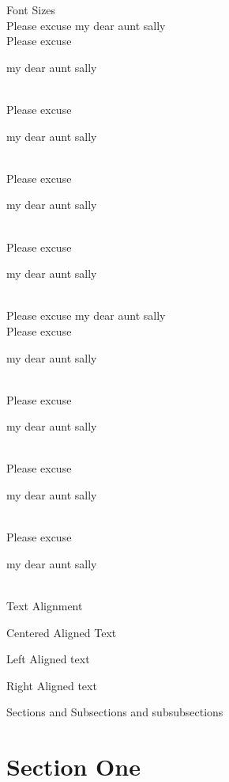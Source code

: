 \documentclass[11pt]{article}
\begin{document}
Font Sizes\\
Please excuse my dear aunt sally\\
Please excuse \begin{large}my dear aunt sally\end{large}\\
Please excuse \begin{Large}my dear aunt sally\end{Large}\\
Please excuse \begin{huge}my dear aunt sally\end{huge}\\
Please excuse \begin{Huge}my dear aunt sally\end{Huge}\\
Please excuse my dear aunt sally\\
Please excuse \begin{normalsize}my dear aunt sally\end{normalsize}\\
Please excuse \begin{small}my dear aunt sally\end{small}\\
Please excuse \begin{scriptsize}my dear aunt sally\end{scriptsize}\\
Please excuse \begin{tiny}my dear aunt sally\end{tiny}\\[4cm]

Text Alignment\\

\begin{center}
    Centered Aligned Text
\end{center}

\begin{flushleft}
    Left Aligned text
\end{flushleft}

\begin{flushright}
    Right Aligned text
\end{flushright}

\pagebreak

Sections and Subsections and subsubsections

\section{Section One}
\end{document}
